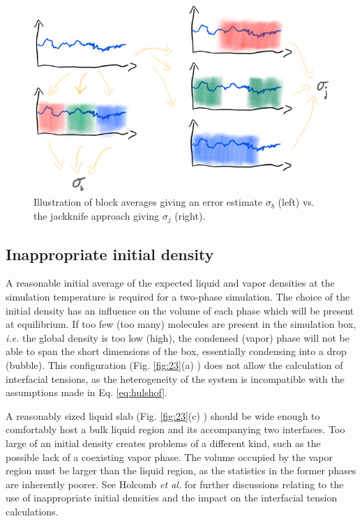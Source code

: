 \documentclass[9pt,tutorial]{livecoms}
\begin{document}
\begin{figure}
	\centering
  \includegraphics[width=\linewidth]{gfx/fig_jackknife.jpeg}
  \caption{Illustration of block averages giving an error estimate $\sigma_b$ (left) vs. the jackknife approach giving $\sigma_j$ (right).}
\label{fig:jackknife}
\end{figure}


\subsection{Inappropriate initial density}
\label{sec:init-dens}
A reasonable initial average of the expected liquid and vapor densities at the
simulation temperature is required for a two-phase simulation. The choice of
the initial density has an influence on the volume of each phase which will be
present at equilibrium.  If too few (too many) molecules are present in the
simulation box, \textit{i.e.} the global density is too low (high), the condensed
(vapor) phase will not be able to span the short dimensions of the box,
essentially condensing into a drop (bubble). This configuration (Fig.
\ref{fig:23}(a) ) does not allow the calculation of interfacial tensions, as
the heterogeneity of the system is incompatible with the assumptions made in
Eq. \ref{eq:hulshof}.

A reasonably sized liquid slab (Fig. \ref{fig:23}(c) ) should be wide enough to comfortably host a bulk liquid
region and its accompanying two interfaces. Too large of an initial density
creates problems of a different kind, such as the possible lack of a coexisting
vapor phase. The volume occupied by the vapor region must be larger than the
liquid region, as the statistics in the former phases are inherently poorer.
See Holcomb \textit{et al.} \citep{holcomb1993} for further discussions relating
to the use of inappropriate initial densities and the impact on the interfacial tension
calculations.
\end{document}
